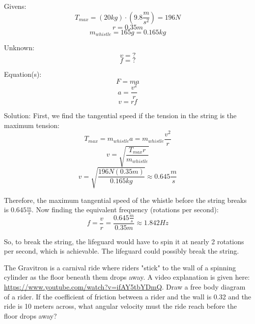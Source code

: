 \begin{Answer}[ref = whistle]
  Givens:
  $$T_{max} = \left( 20 kg \right) \cdot \left( 9.8 \frac{m}{s^2} \right) = 196 N$$
  $$r = 0.35 m$$
  $$m_{whistle} = 165 g = 0.165 kg$$

  Unknown:
  $$v = ?$$
  $$f = ?$$

  Equation(s):
  $$F = ma$$
  $$a = \frac{v^2}{r}$$
  $$v = rf$$

  Solution:
  First, we find the tangential speed if the tension in the string is the maximum tension:
  $$T_{max} = m_{whistle}a = m_{whistle} \frac{v^2}{r}$$
  $$v = \sqrt{\frac{T_{max}r}{m_{whistle}}}$$
  $$v = \sqrt{\frac{196 N \left(0.35 m \right)}{0.165 kg}} \approx 0.645 \frac{m}{s}$$

  Therefore, the maximum tangential speed of the whistle before the string breaks is $0.645 \frac{m}{s}$. Now finding the equivalent frequency (rotations per second):
  $$f = \frac{v}{r} = \frac{0.645 \frac{m}{s}}{0.35 m} \approx 1.842 Hz$$

  So, to break the string, the lifeguard would have to spin it at nearly 2 rotations per second, which is achievable. The lifeguard could possibly break the string.
\end{Answer}

\begin{Exercise}[title = {The Gravitron}, label = gravitron]
  The Gravitron is a carnival ride where riders "stick" to the wall of a spinning cylinder as the floor beneath them drops away. A video explanation is given here: \url{https://www.youtube.com/watch?v=ifAY5tbYDmQ}. Draw a free body diagram of a rider. If the coefficient of friction between a rider and the wall is 0.32 and the ride is 10 meters across, what angular velocity must the ride reach before the floor drops away?
\end{Exercise}

